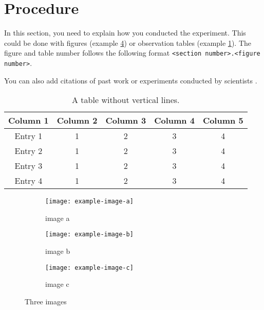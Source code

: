 

\section{Procedure}
In this section, you need to explain how you conducted the experiment. This could be done with figures (example \cref{fig: three images}) or observation tables (example \cref{table: style 1}). The figure and table number follows the following format \texttt{<section number>.<figure number>}.

You can also add citations of past work or experiments conducted by scientists \cite{kottwitz2011}.

\begin{table}[ht]
\centering
\caption{A table without vertical lines.}
\begin{tabular}[t]{ccccc}
\toprule
\color{IITB-blue}\textbf{Column 1}&\color{IITB-blue}\textbf{Column 2}&\color{IITB-blue}\textbf{Column 3}&\color{IITB-blue}\textbf{Column 4}&\color{IITB-blue}\textbf{Column 5}\\
\midrule
Entry 1&1&2&3&4\\
Entry 2&1&2&3&4\\
Entry 3&1&2&3&4\\
Entry 4&1&2&3&4\\
\bottomrule
\end{tabular}
\label{table: style 1}
\end{table}

\begin{figure}[H]
     \centering
     \begin{subfigure}[b]{0.3\textwidth}
         \centering
         \texttt{[image: example-image-a]}
         \caption{image a}
         \label{fig: style 1 image a}
     \end{subfigure}
     \hfill
     \begin{subfigure}[b]{0.3\textwidth}
         \centering
         \texttt{[image: example-image-b]}
         \caption{image b}
         \label{fig: style 1 image b}
     \end{subfigure}
     \hfill
     \begin{subfigure}[b]{0.3\textwidth}
         \centering
         \texttt{[image: example-image-c]}
         \caption{image c}
         \label{fig: style 1 image c}
     \end{subfigure}
        \caption{Three images}
        \label{fig: three images}
\end{figure}

